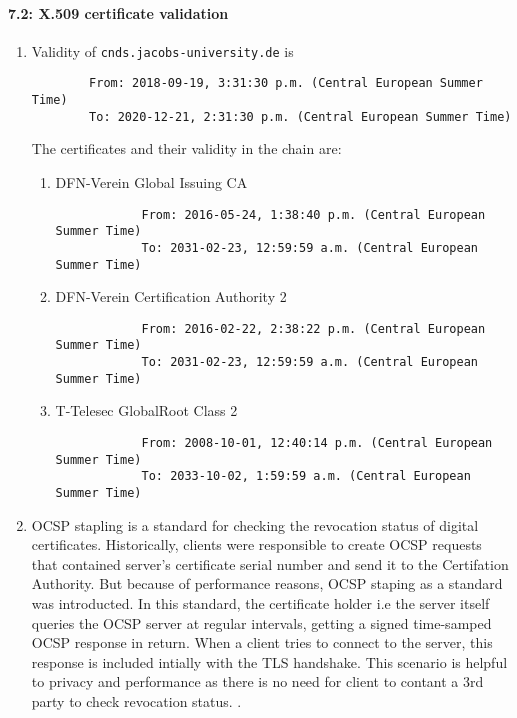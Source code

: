 \documentclass[a4paper]{article}
\begin{document}
\paragraph*{7.2: X.509 certificate validation}
\begin{enumerate}[label=(\alph*)]
    \item Validity of \texttt{cnds.jacobs-university.de} is
        \begin{verbatim}
        From: 2018-09-19, 3:31:30 p.m. (Central European Summer Time)
        To: 2020-12-21, 2:31:30 p.m. (Central European Summer Time)
        \end{verbatim}
        The certificates and their validity in the chain are:
        \begin{enumerate}
            \item DFN-Verein Global Issuing CA
            \begin{verbatim}
            From: 2016-05-24, 1:38:40 p.m. (Central European Summer Time)
            To: 2031-02-23, 12:59:59 a.m. (Central European Summer Time)
            \end{verbatim}
            \item DFN-Verein Certification Authority 2
            \begin{verbatim}
            From: 2016-02-22, 2:38:22 p.m. (Central European Summer Time)
            To: 2031-02-23, 12:59:59 a.m. (Central European Summer Time)
            \end{verbatim}
            \item T-Telesec GlobalRoot Class 2
            \begin{verbatim}
            From: 2008-10-01, 12:40:14 p.m. (Central European Summer Time)
            To: 2033-10-02, 1:59:59 a.m. (Central European Summer Time)
            \end{verbatim}
        \end{enumerate}
    \item OCSP stapling is a standard for checking the revocation status of digital certificates. Historically, clients were responsible to create OCSP requests that contained server's certificate serial number and send it to the Certifation Authority. But because of performance reasons, OCSP staping as a standard was introducted. In this standard, the certificate holder i.e the server itself queries the OCSP server at regular intervals, getting a signed time-samped OCSP response in return. When a client tries to connect to the server, this response is included intially with the TLS handshake. This scenario is helpful to privacy and performance as there is no need for client to contant a 3rd party to check revocation status. \cite{OCSP}. 

\end{enumerate}
\end{document}
